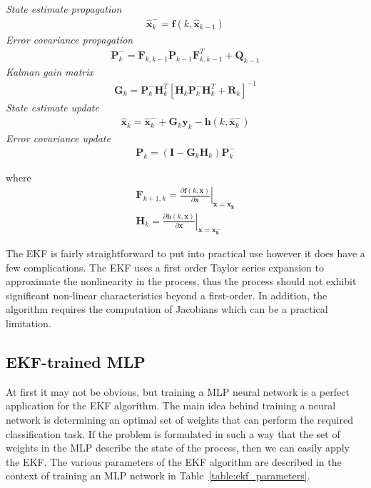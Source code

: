 \documentclass[11pt,letterpaper,titlepage]{article}
\numberwithin{equation}{section}
\numberwithin{figure}{section}
\numberwithin{table}{section}
\begin{document}
\noindent 
\textit{State estimate propagation}
\begin{gather*}
  \mathbf{\hat{x}}_k^{-} = \mathbf{f}(k,\mathbf{\hat{x}}_{k-1})
\end{gather*}
\textit{Error covariance propagation}
\begin{gather*}
  \mathbf{P}_k^{-} = \mathbf{F}_{k,k-1} \mathbf{P}_{k-1} \mathbf{F}^{T}_{k,k-1} + \mathbf{Q}_{k-1}
\end{gather*}
\textit{Kalman gain matrix}
\begin{gather*}
  \mathbf{G}_k = \mathbf{P}_k^{-} \mathbf{H}_k^T \left[ \mathbf{H}_k \mathbf{P}_k^- \mathbf{H}_k^T + \mathbf{R}_k \right]^{-1}
\end{gather*}
\textit{State estimate update}
\begin{gather*}
  \mathbf{\hat{x}}_k = \mathbf{\hat{x}}_k^- + \mathbf{G}_k \mathbf{y}_k - \mathbf{h}(k,\mathbf{\hat{x}}_k^-)
\end{gather*}
\textit{Error covariance update}
\begin{gather*}
  \mathbf{P}_k = (\mathbf{I} - \mathbf{G}_k \mathbf{H}_k) \mathbf{P}_k^-
\end{gather*}

where
\begin{gather*}
  \mathbf{F}_{k+1,k} = \left. \frac{\partial \mathbf{f}(k,\mathbf{x})}{\partial \mathbf{x}} \right\rvert_{\mathbf{x = \mathbf{x}_k}} \\
  \mathbf{H}_{k} = \left. \frac{\partial \mathbf{h}(k,\mathbf{x})}{\partial \mathbf{x}} \right\rvert_{\mathbf{x = \mathbf{x}_k^-}}
\end{gather*}

The EKF is fairly straightforward to put into practical use however it does have a few complications. The EKF uses a first order Taylor series expansion to approximate the nonlinearity in the process, thus the process should not exhibit significant non-linear characteristics beyond a first-order. In addition, the algorithm requires the computation of Jacobians which can be a practical limitation.

\subsection{EKF-trained MLP}
\label{sec:ekf-trained-mlp}

At first it may not be obvious, but training a MLP neural network is a perfect application for the EKF algorithm. The main idea behind training a neural network is determining an optimal set of weights that can perform the required classification task. If the problem is formulated in such a way that the set of weights in the MLP describe the state of the process, then we can easily apply the EKF. The various parameters of the EKF algorithm are described in the context of training an MLP network in Table~\ref{table:ekf_parameters}.
\end{document}
